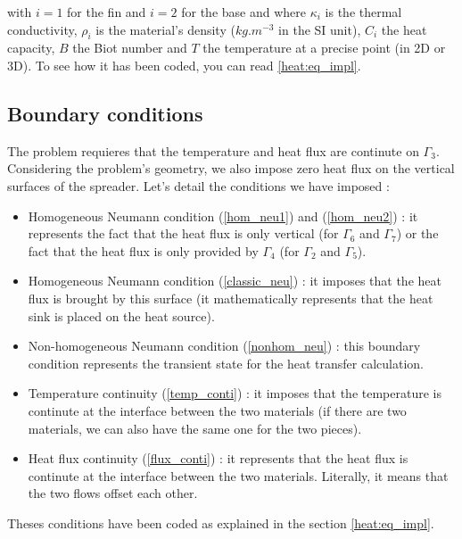 \noindent with $i=1$ for the fin and $i=2$ for the base and where $\kappa_i$ is the thermal conductivity, $\rho_i$ is the material's density ($kg.m^{-3}$ in the SI unit), $C_i$ the heat capacity, $B$ the Biot number and $T$ the temperature at a precise point (in 2D or 3D). To see how it has been coded, you can read \ref{heat:eq_impl}.


\subsection{Boundary conditions}
\label{heat:bc}
The problem requieres that the temperature and heat flux are continute on $\Gamma_3$. Considering the problem's geometry, we also impose zero heat flux on the vertical surfaces of the spreader. Let's detail the conditions we have imposed :
\begin{itemize}
\item Homogeneous Neumann condition (\ref{hom_neu1}) and (\ref{hom_neu2}) : it represents the fact that the heat flux is only vertical (for $\Gamma_6$ and $\Gamma_7$) or the fact that the heat flux is only provided by $\Gamma_4$ (for $\Gamma_2$ and $\Gamma_5$).

\item Homogeneous Neumann condition (\ref{classic_neu}) : it imposes that the heat flux is brought by this surface (it mathematically represents that the heat sink is placed on the heat source).

\item Non-homogeneous Neumann condition (\ref{nonhom_neu}) :  this boundary condition represents the transient state for the heat transfer calculation.

\item Temperature continuity (\ref{temp_conti}) : it imposes that the temperature is continute at the interface between the two materials (if there are two materials, we can also have the same one for the two pieces).

\item Heat flux continuity (\ref{flux_conti}) : it represents that the heat flux is continute at the interface between the two materials. Literally, it means that the two flows offset each other.

\end{itemize}

\noindent Theses conditions have been coded as explained in the section \ref{heat:eq_impl}.

